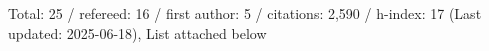 Total: 25 / refereed: 16 / first author: 5 / citations: 2,590 / h-index: 17 (Last updated: 2025-06-18), List attached below